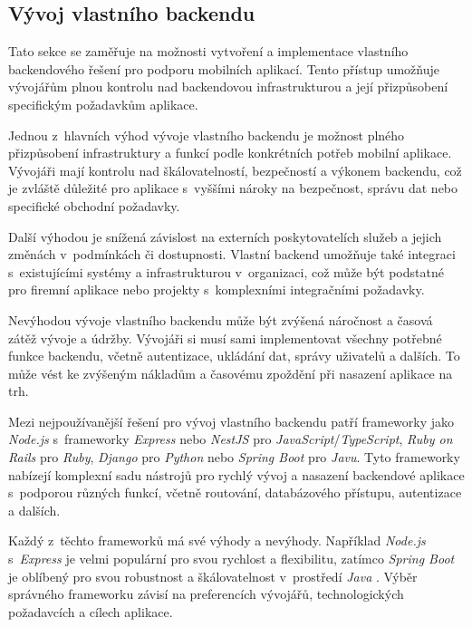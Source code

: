 \subsection{Vývoj vlastního backendu}

Tato sekce se zaměřuje na možnosti vytvoření a implementace vlastního backendového řešení pro podporu mobilních aplikací. Tento přístup umožňuje vývojářům plnou kontrolu nad backendovou infrastrukturou a její přizpůsobení specifickým požadavkům aplikace.

Jednou z~hlavních výhod vývoje vlastního backendu je možnost plného přizpůsobení infrastruktury a funkcí podle konkrétních potřeb mobilní aplikace. Vývojáři mají kontrolu nad škálovatelností, bezpečností a výkonem backendu, což je zvláště důležité pro aplikace s~vyššími nároky na bezpečnost, správu dat nebo specifické obchodní požadavky.

Další výhodou je snížená závislost na externích poskytovatelích služeb a jejich změnách v~podmínkách či dostupnosti. Vlastní backend umožňuje také integraci s~existujícími systémy a infrastrukturou v~organizaci, což může být podstatné pro firemní aplikace nebo projekty s~komplexními integračními požadavky.

Nevýhodou vývoje vlastního backendu může být zvýšená náročnost a časová zátěž vývoje a údržby. Vývojáři si musí sami implementovat všechny potřebné funkce backendu, včetně autentizace, ukládání dat, správy uživatelů a dalších. To může vést ke zvýšeným nákladům a časovému zpoždění při nasazení aplikace na trh.

Mezi nejpoužívanější řešení pro vývoj vlastního backendu patří frameworky jako \emph{Node.js} \cite{node-js} s~frameworky \emph{Express} \cite{node-js-express} nebo \emph{NestJS} \cite{nest-js} pro \emph{JavaScript}/\emph{TypeScript}, \emph{Ruby on Rails} \cite{ruby-on-rails} pro \emph{Ruby}, \emph{Django} \cite{django} pro \emph{Python} nebo \emph{Spring Boot} \cite{spring-boot} pro \emph{Javu}. Tyto frameworky nabízejí komplexní sadu nástrojů pro rychlý vývoj a nasazení backendové aplikace s~podporou různých funkcí, včetně routování, databázového přístupu, autentizace a dalších.

Každý z~těchto frameworků má své výhody a nevýhody. Například \emph{Node.js} s~\emph{Express} je velmi populární pro svou rychlost a flexibilitu, zatímco \emph{Spring Boot} je oblíbený pro svou robustnost a škálovatelnost v~prostředí \emph{Java} \cite{spring-boot-vs-node-js}. Výběr správného frameworku závisí na preferencích vývojářů, technologických požadavcích a cílech aplikace.

